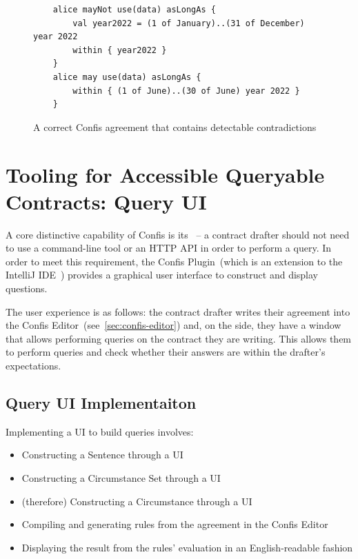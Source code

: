 \begin{figure}[h]
    \centering
    \begin{verbatim}
    alice mayNot use(data) asLongAs {
        val year2022 = (1 of January)..(31 of December) year 2022
        within { year2022 }
    }
    alice may use(data) asLongAs {
        within { (1 of June)..(30 of June) year 2022 }
    }
    \end{verbatim}
    \caption{A correct Confis agreement that contains detectable contradictions}
    \label{fig:confis:contradictions-example}
\end{figure}




\section{Tooling for Accessible Queryable Contracts: Query UI}\label{sec:tooling-for-accessible-queryable-contracts}

A core distinctive capability of Confis is its~ -- a contract drafter should not need to use a command-line tool or an HTTP API in order to perform a query.
In order to meet this requirement, the Confis Plugin~(which is an extension to the IntelliJ IDE~\cite{intelliJRepo, ideaExtensionPoints}) provides a graphical user interface to construct and display questions.

The user experience is as follows: the contract drafter writes their agreement into the Confis Editor~(see~\autoref{sec:confis-editor}) and, on the side, they have a window that allows performing queries on the contract they are writing.
This allows them to perform queries and check whether their answers are within the drafter's expectations.

\subsection{Query UI Implementaiton}

Implementing a UI to build queries involves:

\begin{itemize}
    \item Constructing a Sentence through a UI
    \item Constructing a Circumstance Set through a UI
    \item (therefore) Constructing a Circumstance through a UI
    \item Compiling and generating rules from the agreement in the Confis Editor
    \item Displaying the result from the rules' evaluation in an English-readable fashion
\end{itemize}

